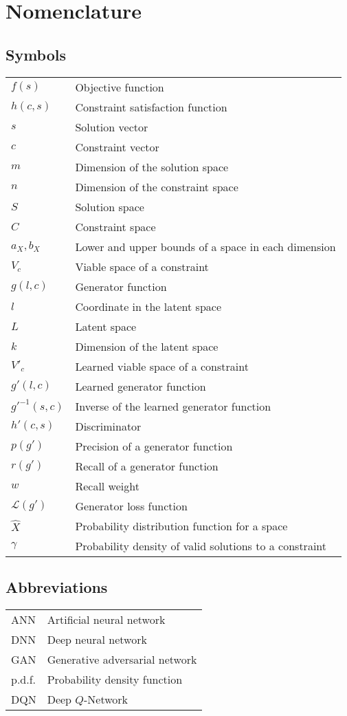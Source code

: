 \documentclass[../main.tex]{subfiles}
\begin{document}
\chapter*{Nomenclature}

\section*{Symbols}

\begin{tabular}{ l l }
    $f(s)$ & Objective function \\ 
    $h(c, s)$ & Constraint satisfaction function \\  
    $s$ & Solution vector \\
    $c$ & Constraint vector \\
    $m$ & Dimension of the solution space \\
    $n$ & Dimension of the constraint space \\
    $S$ & Solution space \\
    $C$ & Constraint space \\
    $a_X, b_X$ & Lower and upper bounds of a space in each dimension \\
    $V_c$ & Viable space of a constraint \\
    $g(l, c)$ & Generator function \\
    $l$ & Coordinate in the latent space \\
    $L$ & Latent space \\
    $k$ & Dimension of the latent space \\
    $V'_c$ & Learned viable space of a constraint \\
    $g'(l, c)$ & Learned generator function \\
    $g'^{-1}(s, c)$ & Inverse of the learned generator function \\
    $h'(c,s)$ & Discriminator \\
    $p(g')$ & Precision of a generator function \\
    $r(g')$ & Recall of a generator function \\
    $w$ & Recall weight \\
    $\mathcal{L}(g')$ & Generator loss function \\
    $\hat{X}$ & Probability distribution function for a space \\
    $\gamma$ & Probability density of valid solutions to a constraint \\
\end{tabular}

\section*{Abbreviations}

\begin{tabular}{ l l }
    ANN & Artificial neural network \\
    DNN & Deep neural network \\
    GAN & Generative adversarial network \\
    p.d.f. & Probability density function \\
    DQN & Deep $Q$-Network \\
\end{tabular}
\end{document}
